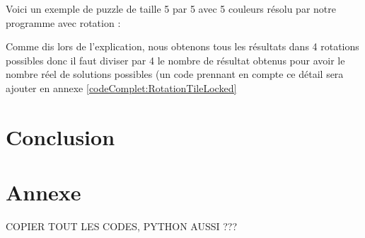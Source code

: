\documentclass[12pt, openany]{report}
\begin{document}
Voici un exemple de puzzle de taille 5 par 5 avec 5 couleurs résolu
par notre programme avec rotation :
\begin{verbnobox}\fontsize{7pt}{7pt}\selectfont
\end{verbnobox}
Comme dis lors de l'explication, nous obtenons tous les résultats dans 4 rotations possibles donc il faut diviser par 4 le nombre de résultat obtenus pour avoir le nombre réel de solutions possibles (un code prennant en compte ce détail sera ajouter en annexe \ref{codeComplet:RotationTileLocked}


\section*{Conclusion}

\section*{Annexe}



COPIER TOUT LES CODES, PYTHON AUSSI ???
\end{document}
